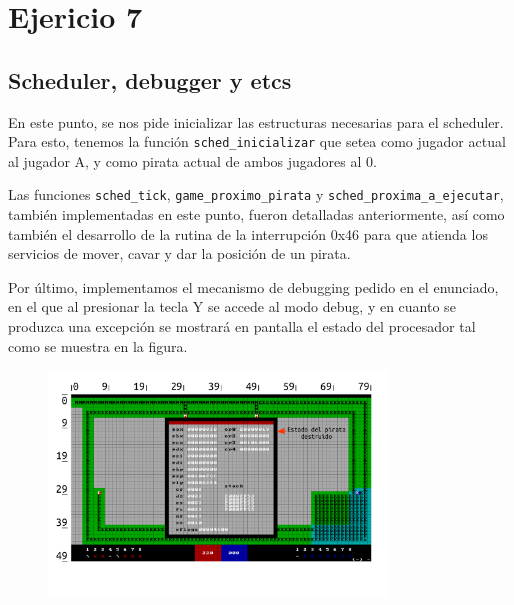 \section{Ejericio 7}

\subsection{Scheduler, debugger y etcs}

En este punto, se nos pide inicializar las estructuras necesarias para el scheduler. Para esto, tenemos la función \texttt{sched\_inicializar} que setea como jugador actual al jugador A, y como pirata actual de ambos jugadores al 0.

Las funciones \texttt{sched\_tick}, \texttt{game\_proximo\_pirata} y \texttt{sched\_proxima\_a\_ejecutar}, también implementadas en este punto, fueron detalladas anteriormente, así como también el desarrollo de la rutina de la interrupción 0x46 para que atienda los servicios de mover, cavar y dar la posición de un pirata.

Por último, implementamos el mecanismo de debugging pedido en el enunciado, en el que al presionar la tecla Y se accede al modo debug, y en cuanto se produzca una excepción se mostrará en pantalla el estado del procesador tal como se muestra en la figura.

\begin{figure}[ht]
\centering
\includegraphics[width=90mm]{ej_7/img_ej_7.png}
\end{figure}

